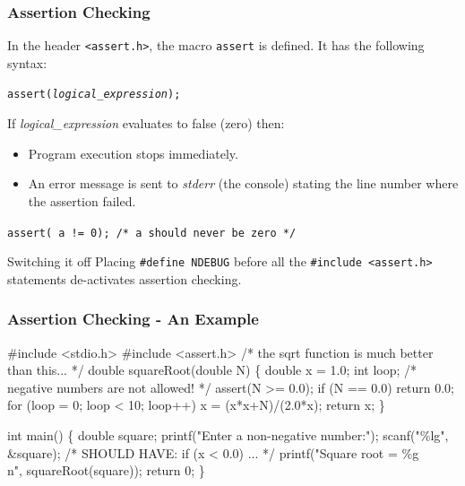 \documentclass[table]{beamer}
\newif\ifschigh\schighfalse
\newcommand{\kw}[1]{\ifschigh\textcolor{red}{#1}\else\textcolor{keyword}{#1}\fi}
\newcommand{\kt}[1]{\ifschigh\textcolor{red}{#1}\else\textcolor{ctext}{#1}\fi}
\newcommand{\kc}[1]{\ifschigh\textcolor{red}{#1}\else\textcolor{comment}{#1}\fi}
\newcounter{sckll}
\newcommand{\kr}{\setcounter{sckll}{1}}
\newcommand{\kl}{}
\begin{document}
\begin{frame}
\frametitle{Assertion Checking}
In the header \kt{\tt <assert.h>}, the macro {\tt assert} is defined. It has the following syntax:\\
\begin{center}
\tt assert(\emph{logical\_expression});
\end{center}
If \emph{logical\_expression} evaluates to false (zero) then:
\begin{itemize}
\item Program execution stops immediately.
\item An error message is sent to \emph{stderr} (the console) stating the line number where the assertion failed.
\end{itemize} 
\begin{block}{}
{\tt assert( a != 0); \kc{/* a should never be zero */}}
\end{block}
\begin{exampleblock}{Switching it off}
Placing {\tt \kw{\#define} NDEBUG} before all the \mbox{\tt \kw{\#include} \kt{<assert.h>}}
statements de-activates assertion checking.
\end{exampleblock}
\end{frame}

\begin{frame}[fragile]
\frametitle{Assertion Checking - An Example}
\vspace{-0.2in}
\begin{semiverbatim}
\scriptsize
\kr\kl\kw{\#include} \kt{<stdio.h>}
\kl\kw{\#include} \kt{<assert.h>}
\kl\kc{/* the sqrt function is much better than this... */}
\kl\kw{double} squareRoot(\kw{double} N)
\kl\{
\kl   \kw{double} x = 1.0;
\kl   \kw{int} loop;
\kl   \kc{/* negative numbers are not allowed! */}
\kl   assert(N >= 0.0);
\kl   \kw{if} (N == 0.0) \kw{return} 0.0;
\kl   \kw{for} (loop = 0; loop < 10; loop++)
\kl      x = (x*x+N)/(2.0*x);
\kl   \kw{return} x;
\kl\}
\kl
\kl\kw{int} main()
\kl\{
\kl   \kw{double} square;
\kl   printf(\kt{"Enter a non-negative number:"});
\kl   scanf(\kt{"\%lg"}, \&square);
\kl   \kc{/* SHOULD HAVE: if (x < 0.0) ...        */}
\kl   printf(\kt{"Square root = \%g\\n"}, squareRoot(square));
\kl   \kw{return} 0;
\kl\}
\end{semiverbatim}
\end{frame}
\end{document}

